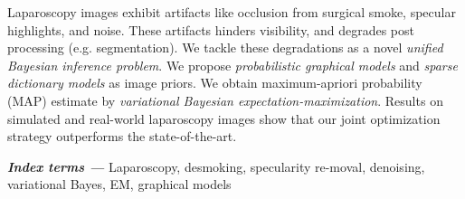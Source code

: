 \begin{Abstract}
Laparoscopy images exhibit artifacts like occlusion from surgical smoke, specular highlights, and noise. These artifacts hinders visibility, and degrades post processing (e.g. segmentation). We tackle these degradations as a novel \textit{unified Bayesian inference problem}. We propose \textit{probabilistic graphical models} and \textit{sparse dictionary models} as image priors. We obtain maximum-apriori probability (MAP) estimate by \textit{variational Bayesian expectation-maximization}. Results on simulated and real-world laparoscopy images show that our joint optimization strategy outperforms the state-of-the-art.

\textbf{\textit{Index terms ---}} Laparoscopy, desmoking, specularity re-moval, denoising, variational Bayes, EM, graphical models
%
%
%
%
%
\end{Abstract}


